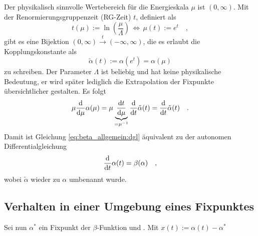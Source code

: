     Der physikalisch sinnvolle Wertebereich für die Energieskala $\mu$ ist $(0,\infty)$. 
    Mit der Renormierungsgruppenzeit (RG-Zeit) $t$, definiert als
    \begin{equation}
     t(\mu):=\ln\left(\frac{\mu}{\Lambda}\right) \,
     \Leftrightarrow \, \mu(t):=e^t \quad ,
    \end{equation}
    gibt es eine Bijektion $(0,\infty)\overset{t}{\longrightarrow}(-\infty,\infty)$, die 
    es erlaubt die Kopplungskonstante als 
    \begin{equation}
    \tilde{\alpha}(t):=\alpha(e^t)=\alpha(\mu)
    \end{equation}
    zu schreiben. Der Parameter $\Lambda$ ist beliebig und hat keine physikalische Bedeutung, 
    er wird später lediglich die Extrapolation der Fixpunkte übersichtlicher gestalten. Es folgt
    \begin{equation}
     \mu\frac{\text{d}}{\text{d}\mu}\alpha(\mu) = \mu \underbrace{\frac{\text{d} t}{\text{d} \mu}}_{=\mu^{-1}}
     \frac{\text{d}}{\text{d} t} \tilde{\alpha}(t)
     =\frac{\text{d}}{\text{d} t} \tilde{\alpha}(t) \quad .
    \end{equation}
    Damit ist Gleichung \eqref{eq:beta_allgemein:dgl} äquivalent zu der autonomen 
    Differentialgleichung
    \begin{equation}
     \frac{\text{d}}{\text{d} t} \alpha(t)=\beta(\alpha) \quad ,
    \end{equation}
    wobei $\tilde{\alpha}$ wieder zu $\alpha$ umbenannt wurde.
    
  \subsection{Verhalten in einer Umgebung eines Fixpunktes}
    Sei nun $\alpha^*$ ein Fixpunkt der $\beta$-Funktion und . Mit $x(t):=\alpha(t)-\alpha^*$ 



      


  
  
  
  

